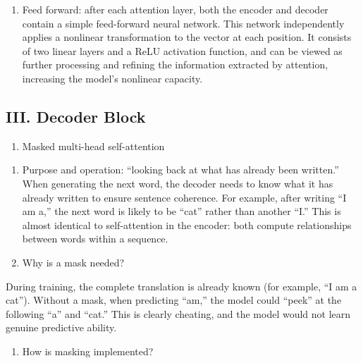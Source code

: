 \begin{enumerate}
\def\labelenumi{\arabic{enumi}.}
\setcounter{enumi}{3}
\tightlist
\item
  Feed forward: after each attention layer, both the encoder and decoder contain a simple feed-forward neural network. This network independently applies a nonlinear transformation to the vector at each position. It consists of two linear layers and a ReLU activation function, and can be viewed as further processing and refining the information extracted by attention, increasing the model's nonlinear capacity.
\end{enumerate}

\hypertarget{iii.-decoder-block}{%
\subsection{III. Decoder Block}\label{iii.-decoder-block}}

\begin{enumerate}
\def\labelenumi{\arabic{enumi}.}
\tightlist
\item
  Masked multi-head self-attention
\end{enumerate}

\begin{enumerate}
\def\labelenumi{(\arabic{enumi})}
\item
  Purpose and operation: ``looking back at what has already been written.'' When generating the next word, the decoder needs to know what it has already written to ensure sentence coherence. For example, after writing ``I am a,'' the next word is likely to be ``cat'' rather than another ``I.'' This is almost identical to self-attention in the encoder: both compute relationships between words within a sequence.
\item
  Why is a mask needed?
\end{enumerate}

During training, the complete translation is already known (for example, ``I am a cat''). Without a mask, when predicting ``am,'' the model could ``peek'' at the following ``a'' and ``cat.'' This is clearly cheating, and the model would not learn genuine predictive ability.

\begin{enumerate}
\def\labelenumi{(\arabic{enumi})}
\setcounter{enumi}{2}
\tightlist
\item
  How is masking implemented?
\end{enumerate}

